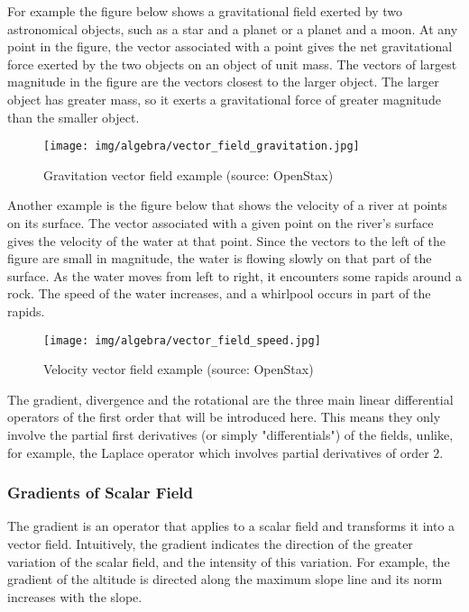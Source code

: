 	For example the figure below shows a gravitational field exerted by two astronomical objects, such as a star and a planet or a planet and a moon. At any point in the figure, the vector associated with a point gives the net gravitational force exerted by the two objects on an object of unit mass. The vectors of largest magnitude in the figure are the vectors closest to the larger object. The larger object has greater mass, so it exerts a gravitational force of greater magnitude than the smaller object.
	\begin{figure}[H]
		\centering
		\texttt{[image: img/algebra/vector\_field\_gravitation.jpg]}
		\caption[Gravitation vector field example]{Gravitation vector field example (source: OpenStax)}
	\end{figure}
	Another example is the figure below that shows the velocity of a river at points on its surface. The vector associated with a given point on the river's surface gives the velocity of the water at that point. Since the vectors to the left of the figure are small in magnitude, the water is flowing slowly on that part of the surface. As the water moves from left to right, it encounters some rapids around a rock. The speed of the water increases, and a whirlpool occurs in part of the rapids.
	\begin{figure}[H]
		\centering
		\texttt{[image: img/algebra/vector\_field\_speed.jpg]}
		\caption[Velocity vector field example]{Velocity vector field example (source: OpenStax)}
	\end{figure}
	The gradient, divergence and the rotational are the three main linear differential operators of the first order that will be introduced here. This means they only involve the partial first derivatives (or simply "differentials") of the fields, unlike, for example, the Laplace operator which involves partial derivatives of order $2$.	
	
	\pagebreak
	\subsubsection{Gradients of Scalar Field}\label{gradient scalar field}
	The gradient is an operator that applies to a scalar field and transforms it into a vector field. Intuitively, the gradient indicates the direction of the greater variation of the scalar field, and the intensity of this variation. For example, the gradient of the altitude is directed along the maximum slope line and its norm increases with the slope.
	
